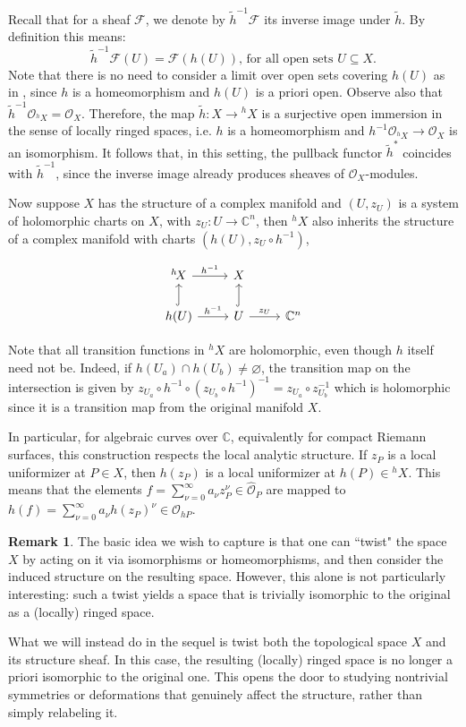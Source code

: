 \documentclass[10pt]{amsart}
\theoremstyle{definition}
\newtheorem{remark}[theorem]{Remark}
\renewcommand{\O}{{\mathcal{O}}}
\begin{document}
Recall that for a sheaf $\mathcal{F}$, we denote by  
$\tilde{h}^{-1}\mathcal{F}$ its inverse image under $\tilde{h}$. By definition this means:
\[
  \tilde{h}^{-1} \mathcal{F}(U)= \mathcal{F}(h(U)) \text{, for all open sets } U\subseteq X. 
\]
Note that there is no need to consider a limit over open sets covering $h(U)$ as in \cite[p.65]{Hartshorne:77}, since $h$ is a homeomorphism and $h(U)$ is a priori open. Observe also that $\tilde{h}^{-1} \O_{^h\!X} = \O_X$. 
Therefore, the map $\tilde{h}\colon X \to {^h \!X}$ is a surjective open immersion in the sense of locally ringed spaces, 
i.e. $h$ is a homeomorphism and $h^{-1} \O_{{^h \!X}} \to \O_X$ is an isomorphism.  
It follows that, in this setting, the pullback functor $\tilde h^*$ coincides with $\tilde h^{-1}$, since the inverse image already produces sheaves of $\O_X$-modules. 

Now suppose $X$ has the structure of a complex manifold and $(U,z_U)$ is a system of holomorphic charts on $X$, with $z_U\colon U \rightarrow \mathbb{C}^n$,  then ${^h\!X}$ also inherits the structure of a complex manifold with charts $(h(U),  z_{U} \circ h^{-1})$, 


\[
\begin{tikzcd}
{^h\!X} \arrow[r, "h^{-1}"] & X \\
h(U) \arrow[r, "h^{-1}"] \arrow[u, hook] & U \arrow[r, "z_U"] \arrow[u, hook] & \mathbb{C}^n
\end{tikzcd}
\]

Note that all transition functions in ${^h  \! X}$ are holomorphic, even though $h$ itself need not be.
Indeed, if $h(U_a)\cap h(U_b)\neq \varnothing$, the transition map on the intersection is given by $z_{U_a}\circ h^{-1} \circ (z_{U_b}\circ h^{-1})^{-1} = z_{U_a} \circ z^{-1}_{U_b}$ which is holomorphic since it is a transition map from the original manifold $X$.


In particular, for algebraic curves over $\mathbb{C}$, equivalently for compact Riemann surfaces, this construction respects the local analytic structure. If $z_P$ is a local uniformizer at $P\in X$, then $h(z_P)$ is a local uniformizer at $h(P) \in {^h \! X}$.
This means that the elements $f=\sum_{\nu =0}^\infty a_\nu z_P^\nu\in \widehat{\O}_P$ are mapped to $h(f)=\sum_{\nu =0}^\infty a_\nu h(z_P)^\nu\in \widehat{\O}_{hP}$. 


\begin{remark}
The basic idea we wish to capture is that one can ``twist" the space $X$ by acting on it via isomorphisms or homeomorphisms, and then consider the induced structure on the resulting space. However, this alone is not particularly interesting: such a twist yields a space that is trivially isomorphic to the original as a (locally) ringed space.

What we will instead do in the sequel is twist both the topological space $X$ and its structure sheaf. In this case, the resulting (locally) ringed space is no longer a priori isomorphic to the original one. This opens the door to studying nontrivial symmetries or deformations that genuinely affect the structure, rather than simply relabeling it.

\end{remark}
\end{document}
